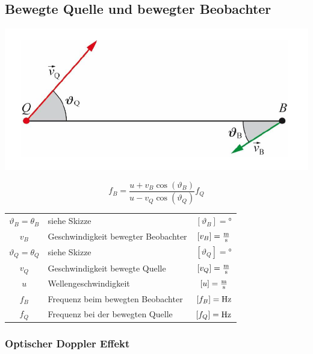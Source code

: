 \subsection{Bewegte Quelle und bewegter Beobachter}

\begin{minipage}{0.48\linewidth}
\includegraphics[width=0.98\linewidth]{Bilder/Wellen-Optik/akustischer_doppler_effekt} \\
\end{minipage}
\hfill
\begin{minipage}{0.48\linewidth}
$$ \boxed{f_B = \frac{u+ v_B \cos(\vartheta_B)}{u- v_Q \cos(\vartheta_Q)}f_Q} $$
\end{minipage}

\renewcommand{\arraystretch}{1.1}
\begin{tabular}{clc}
$\vartheta_B = \theta_B$ & siehe Skizze & $[\vartheta_B] = $°\\
$v_B$ & Geschwindigkeit bewegter Beobachter & $[v_B] = \frac{\mathrm{m}}{\mathrm{s}}$ \\
$\vartheta_Q = \theta_Q$ & siehe Skizze & $[\vartheta_Q] = $°\\
$v_Q$ & Geschwindigkeit bewegte Quelle & $[v_Q] = \frac{\mathrm{m}}{\mathrm{s}}$ \\
$u$ & Wellengeschwindigkeit & $[u] = \frac{\mathrm{m}}{\mathrm{s}}$ \\
$f_B$ & Frequenz beim bewegten Beobachter & $[f_B] = \mathrm{Hz}$ \\
$f_Q$ & Frequenz bei der bewegten Quelle & $[f_Q] = \mathrm{Hz}$ \\
\end{tabular}
\renewcommand{\arraystretch}{1}



\subsubsection{Optischer Doppler Effekt}


